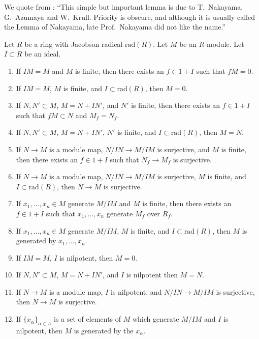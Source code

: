 \begin{lemma}
\label{lemma-NAK}
\begin{reference}
\cite[1.M Lemma (NAK) page 11]{MatCA}
\end{reference}
\begin{history}
We quote from \cite{MatCA}: ``This simple but
important lemma is due to T.~Nakayama, G.~Azumaya and W.~Krull. Priority
is obscure, and although it is usually called the Lemma of Nakayama, late
Prof.~Nakayama did not like the name.''
\end{history}
Let $R$ be a ring with Jacobson radical $\text{rad}(R)$.
Let $M$ be an $R$-module. Let $I \subset R$
be an ideal.
\begin{enumerate}
\item
\label{item-nakayama}
If $IM = M$ and $M$ is finite, then there exists an $f \in 1 + I$ such that
$fM = 0$.
\item If $IM = M$, $M$ is finite, and $I \subset \text{rad}(R)$, then $M = 0$.
\item If $N, N' \subset M$, $M = N + IN'$, and $N'$ is finite,
then there exists an $f \in 1 + I$ such that $fM \subset N$ and $M_f = N_f$.
\item If $N, N' \subset M$, $M = N + IN'$, $N'$ is finite, and
$I \subset \text{rad}(R)$, then $M = N$.
\item If $N \to M$ is a module map, $N/IN \to M/IM$ is
surjective, and $M$ is finite, then there exists an $f \in 1 + I$
such that $N_f \to M_f$ is surjective.
\item If $N \to M$ is a module map, $N/IN \to M/IM$ is
surjective, $M$ is finite, and $I \subset \text{rad}(R)$,
then $N \to M$ is surjective.
\item If $x_1, \ldots, x_n \in M$ generate $M/IM$ and $M$ is finite,
then there exists an $f \in 1 + I$ such that $x_1, \ldots, x_n$
generate $M_f$ over $R_f$.
\item If $x_1, \ldots, x_n \in M$ generate $M/IM$, $M$ is finite, and
$I \subset \text{rad}(R)$, then $M$ is generated by $x_1, \ldots, x_n$.
\item If $IM = M$, $I$ is nilpotent, then $M = 0$.
\item If $N, N' \subset M$, $M = N + IN'$, and $I$ is nilpotent then $M = N$.
\item If $N \to M$ is a module map, $I$ is nilpotent, and $N/IN \to M/IM$
is surjective, then $N \to M$ is surjective.
\item If $\{x_\alpha\}_{\alpha \in A}$ is a set of elements of $M$
which generate $M/IM$ and $I$ is nilpotent, then $M$ is generated
by the $x_\alpha$.
\end{enumerate}
\end{lemma}

